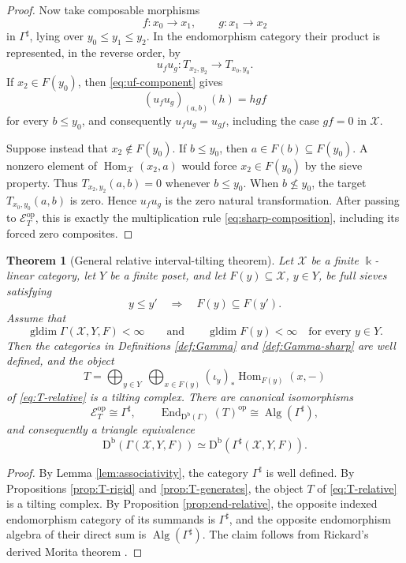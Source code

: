 \documentclass[12pt,a4paper,english,reqno]{amsart}
\theoremstyle{plain}
\newtheorem{theorem}{Theorem}[section]
\theoremstyle{definition}
\newcommand{\kk}{\Bbbk}
\newcommand{\Db}{\mathrm D^{\mathrm b}}
\newcommand{\Hom}{\operatorname{Hom}}
\newcommand{\End}{\operatorname{End}}
\newcommand{\gldim}{\operatorname{gldim}}
\newcommand{\op}{\mathrm{op}}
\newcommand{\X}{\mathcal X}
\newcommand{\G}{\Gamma}
\newcommand{\Gs}{\Gamma^{\sharp}}
\begin{document}
\begin{proof}
Now take composable morphisms
\[
 f:x_0\longrightarrow x_1,\qquad
 g:x_1\longrightarrow x_2
\]
in $\Gs$, lying over $y_0\leq y_1\leq y_2$.  In the endomorphism
category their product is represented, in the reverse order, by
\[
 u_f u_g:T_{x_2,y_2}\longrightarrow T_{x_0,y_0}.
\]
If $x_2\in F(y_0)$, then \eqref{eq:uf-component} gives
\[
 (u_fu_g)_{(a,b)}(h)=hgf
 \]
for every $b\leq y_0$, and consequently $u_fu_g=u_{gf}$, including the
case $gf=0$ in $\X$.

Suppose instead that $x_2\notin F(y_0)$.  If $b\leq y_0$, then
$a\in F(b)\subseteq F(y_0)$.  A nonzero element of
$\Hom_{\X}(x_2,a)$ would force $x_2\in F(y_0)$ by the sieve property.
Thus $T_{x_2,y_2}(a,b)=0$ whenever $b\leq y_0$.  When
$b\nleq y_0$, the target $T_{x_0,y_0}(a,b)$ is zero.  Hence
$u_fu_g$ is the zero natural transformation. After passing to
$\mathcal E_T^{\op}$, this is exactly the multiplication rule
\eqref{eq:sharp-composition}, including its forced zero composites.
\end{proof}

\begin{theorem}[General relative interval-tilting theorem]
\label{thm:relative}
Let $\X$ be a finite $\kk$-linear category, let $Y$ be a finite
poset, and let
$F(y)\subseteq\X$, $y\in Y$, be full sieves satisfying
\[
 y\leq y'\quad\Longrightarrow\quad F(y)\subseteq F(y').
\]
Assume that
\[
 \gldim\G(\X,Y,F)<\infty
 \qquad\text{and}\qquad
 \gldim F(y)<\infty\quad\text{for every }y\in Y.
\]
Then the categories in Definitions \ref{def:Gamma} and \ref{def:Gamma-sharp} are well defined,
and the object
\[
 T=\bigoplus_{y\in Y}\ \bigoplus_{x\in F(y)}
 (\iota_y)_*\Hom_{F(y)}(x,-)
\]
of \eqref{eq:T-relative} is a tilting complex. There are canonical
isomorphisms
\[
 \mathcal E_T^{\op}\cong\Gs,
 \qquad
 \End_{\Db(\G)}(T)^{\op}
 \cong\operatorname{Alg}(\Gs),
\]
and consequently a triangle equivalence
\[
 \Db(\G(\X,Y,F))\simeq\Db(\Gs(\X,Y,F)).
\]
\end{theorem}

\begin{proof}
By Lemma \ref{lem:associativity}, the category $\Gs$ is well defined.  By
Propositions \ref{prop:T-rigid} and \ref{prop:T-generates}, the object $T$ of
\eqref{eq:T-relative} is a tilting complex. By
Proposition \ref{prop:end-relative}, the opposite indexed endomorphism
category of its summands is $\Gs$, and the opposite endomorphism algebra of
their direct sum is $\operatorname{Alg}(\Gs)$.
The claim follows from Rickard's derived Morita theorem
\cite{Rickard1989}.
\end{proof}
\end{document}
